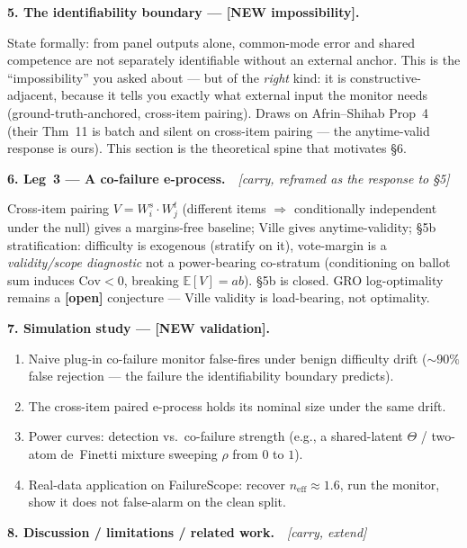 \documentclass[11pt,a4paper]{article}
\begin{document}
\medskip
\noindent\textbf{5. The identifiability boundary --- \textbf{[NEW impossibility]}.}

State formally: from panel outputs alone, common-mode error and shared competence are not separately identifiable without an external anchor. This is the ``impossibility'' you asked about --- but of the \emph{right} kind: it is constructive-adjacent, because it tells you exactly what external input the monitor needs (ground-truth-anchored, cross-item pairing). Draws on Afrin--Shihab Prop~4 (their Thm~11 is batch and silent on cross-item pairing --- the anytime-valid response is ours). This section is the theoretical spine that motivates \S6.

\medskip
\noindent\textbf{6. Leg~3 --- A co-failure e-process.}\ \ \textit{[carry, reframed as the response to \S5]}

Cross-item pairing $V = W_i^s \cdot W_j^t$ (different items $\Rightarrow$ conditionally independent under the null) gives a margins-free baseline; Ville gives anytime-validity; \S5b stratification: difficulty is exogenous (stratify on it), vote-margin is a \emph{validity/scope diagnostic} not a power-bearing co-stratum (conditioning on ballot sum induces $\mathrm{Cov} < 0$, breaking $\mathbb{E}[V] = ab$). \S5b is closed. GRO log-optimality remains a \textbf{[open]} conjecture --- Ville validity is load-bearing, not optimality.

\medskip
\noindent\textbf{7. Simulation study --- \textbf{[NEW validation]}.}

\begin{enumerate}[label=(\alph*)]
  \item Naive plug-in co-failure monitor false-fires under benign difficulty drift (${\sim}90\%$ false rejection --- the failure the identifiability boundary predicts).
  \item The cross-item paired e-process holds its nominal size under the same drift.
  \item Power curves: detection vs.\ co-failure strength (e.g., a shared-latent $\Theta$ / two-atom de~Finetti mixture sweeping $\rho$ from $0$ to $1$).
  \item Real-data application on FailureScope: recover $n_{\text{eff}} \approx 1.6$, run the monitor, show it does not false-alarm on the clean split.
\end{enumerate}

\medskip
\noindent\textbf{8. Discussion / limitations / related work.}\ \ \textit{[carry, extend]}
\end{document}
